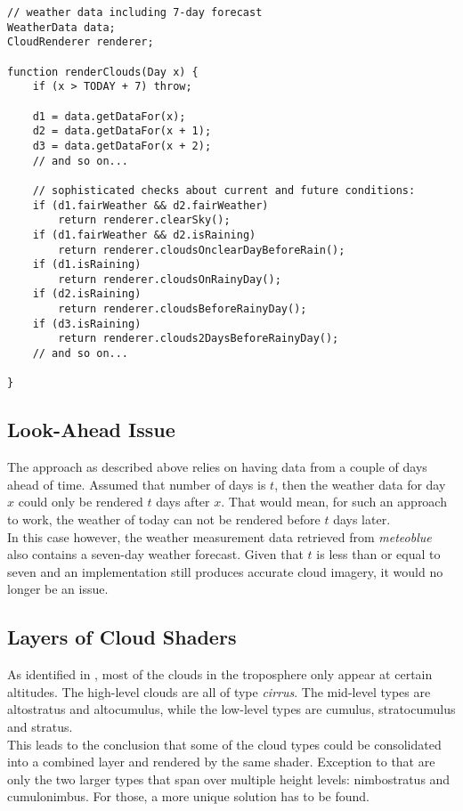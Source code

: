 \begin{lstlisting}[language=HLSL, caption=Pseudo-code of cloud render algorithm., label=lst:pseudo:algorithm]
// weather data including 7-day forecast
WeatherData data;
CloudRenderer renderer;

function renderClouds(Day x) {
    if (x > TODAY + 7) throw;

    d1 = data.getDataFor(x);
    d2 = data.getDataFor(x + 1);
    d3 = data.getDataFor(x + 2);
    // and so on...

    // sophisticated checks about current and future conditions:
    if (d1.fairWeather && d2.fairWeather)
        return renderer.clearSky();
    if (d1.fairWeather && d2.isRaining)
        return renderer.cloudsOnclearDayBeforeRain();
    if (d1.isRaining)
        return renderer.cloudsOnRainyDay();
    if (d2.isRaining) 
        return renderer.cloudsBeforeRainyDay();
    if (d3.isRaining) 
        return renderer.clouds2DaysBeforeRainyDay();
    // and so on...
    
}
\end{lstlisting}

\clearpage

\subsection{Look-Ahead Issue}
The approach as described above relies on having data from a couple of days ahead of time. Assumed that number of days is $t$, then the weather data for day $x$ could only be rendered $t$ days after $x$.
That would mean, for such an approach to work, the weather of today can not be rendered before $t$ days later.
\\
In this case however, the weather measurement data retrieved from \emph{meteoblue} also contains a seven-day weather forecast. 
Given that $t$ is less than or equal to seven and an implementation still produces accurate cloud imagery, it would no longer be an issue.

\subsection{Layers of Cloud Shaders}
\label{section:impl:layers}
As identified in , most of the clouds in the troposphere only appear at certain \gls{altitude}s.
The high-level clouds are all of type \emph{cirrus}.
The mid-level types are altostratus and altocumulus, while the low-level types are cumulus, stratocumulus and stratus.
\\
This leads to the conclusion that some of the cloud types could be consolidated into a combined layer and rendered by the same shader.
Exception to that are only the two larger types that span over multiple height levels: nimbostratus and cumulonimbus. For those, a more unique solution has to be found.

